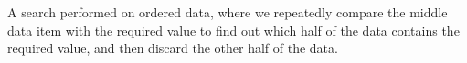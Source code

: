  A search performed on ordered data, where we repeatedly
compare the middle data item with the required value to find out
which half of the data contains the required value, and then discard 
the other half of the data.
